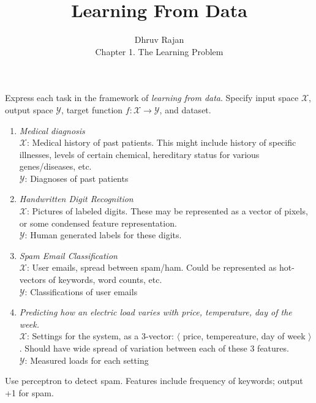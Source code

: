 \documentclass[10pt]{article}
\newenvironment{exercise}[2][Exercise]{\begin{trivlist}
\item[\hskip \labelsep {\bfseries #1}\hskip \labelsep {\bfseries #2.}]}{\end{trivlist}}
\begin{document}
 
\title{Learning From Data}
\author{Dhruv Rajan\\
Chapter 1. The Learning Problem}
\maketitle
 
\begin{exercise}{1.1}
  Express each task in the framework of \textit{learning from
    data}. Specify input space $\mathcal{X}$, output space
  $\mathcal{Y}$, target function $f : \mathcal{X \rightarrow Y}$, and
  dataset.
\end{exercise}



\begin{enumerate}
\item \textit{Medical diagnosis} \\
  $\mathcal{X}$: Medical history of past patients. This might include
  history of specific illnesses, levels of certain chemical,
  hereditary status for various genes/diseases, etc.\\
  $\mathcal{Y}$: Diagnoses of past patients
\item \textit{Handwritten Digit Recognition} \\
  $\mathcal{X}$: Pictures of labeled digits. These may be represented
  as a vector of pixels, or some condensed feature representation.\\
  $\mathcal{Y}$: Human generated labels for these digits.
\item \textit{Spam Email Classification} \\
  $\mathcal{X}$: User emails, spread between spam/ham. Could be represented
  as hot-vectors of keywords, word counts, etc.\\
  $\mathcal{Y}$: Classifications of user emails
\item \textit{Predicting how an electric load varies with price, temperature, day of the week.} \\
  $\mathcal{X}$: Settings for the system, as a 3-vector: $\langle$
  price, tempereature, day of week $\rangle$. Should
  have wide spread of variation between each of these 3 features.\\
  $\mathcal{Y}$: Measured loads for each setting
\end{enumerate}



\begin{exercise}{1.2}
  Use perceptron to detect spam. Features include frequency of keywords; output +1 for spam.
\end{exercise}
\end{document}
